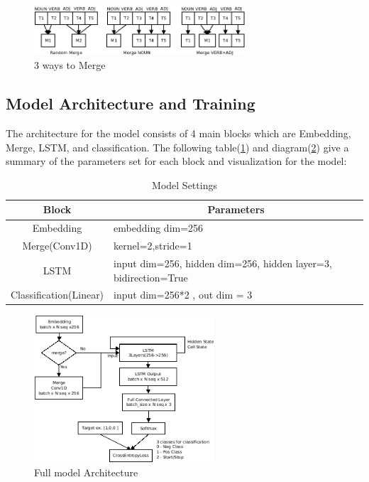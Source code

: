 \documentclass[12pt]{article}
\begin{document}
\begin{figure} [!h]
\begin{center}
\includegraphics[width=0.7\textwidth]{figures/merge.png}
\caption{3 ways to Merge}
\label{fig:3waysonmerge}
\end{center}
\end{figure}


\subsection{Model Architecture and Training}\label{modelarch}
The architecture for the model consists of 4 main blocks which are Embedding, Merge, LSTM, and classification. The following table(\ref{tab:modelsettings}) and diagram(\ref{fig:modelArch}) give a summary of the parameters set for each block and visualization for the model:
\begin{table}[!h]
\begin{tabular}{|c|l|}
\hline
Block                   & \multicolumn{1}{c|}{Parameters}                                 \\ \hline
Embedding               & embedding dim=256                                               \\ \hline
Merge(Conv1D)          & kernel=2,stride=1                                               \\ \hline
LSTM                    & input dim=256, hidden dim=256, hidden layer=3, bidirection=True \\ \hline
Classification(Linear) & input dim=256*2 , out dim = 3                                   \\ \hline
\end{tabular}
\caption{Model Settings}
\label{tab:modelsettings}
\end{table}
\newpage
\begin{figure} [!h]
\begin{center}
\includegraphics[width=0.6\textwidth]{figures/modelDiagram.png}
\caption{Full model Architecture}
\label{fig:modelArch}
\end{center}
\end{figure}
\end{document}
